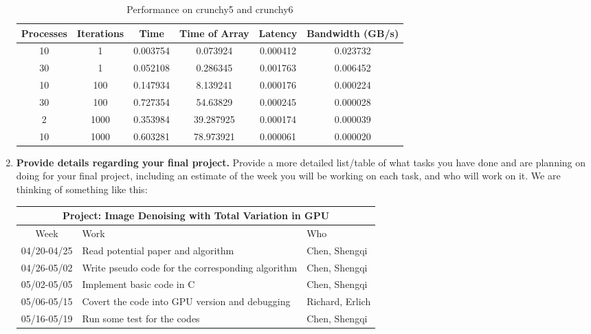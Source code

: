 \documentclass[12pt]{article}
\begin{document}
\begin{enumerate}
	\begin{table}[h!]
\centering
\begin{tabular}{ |c|c|c|c|c|c| }
\hline
Processes&	Iterations&	Time &	Time of Array&	Latency&	Bandwidth (GB/s)\\
\hline
10&	1&	0.003754&	0.073924&	0.000412&	0.023732\\
\hline
30&	1&	0.052108&	0.286345&	0.001763&	0.006452\\
\hline
10&	100&	0.147934&	8.139241&	0.000176&	0.000224\\
\hline
30&	100&	0.727354&	54.63829&	0.000245&	0.000028\\
\hline
2&	1000&	0.353984&	39.287925&	0.000174&	0.000039\\
\hline
10&	1000&	0.603281&	78.973921&	0.000061&	0.000020\\
\hline
\end{tabular}
 \caption{Performance on crunchy5 and crunchy6}
 \label{mpi1}
 \end{table} 


\item {\bf Provide details regarding your final project.}
  Provide a more detailed list/table of what tasks you have done and are planning on
  doing for your final project, including an estimate of the  week
  you will be working on each task, and who will work on it. We are
  thinking of something like this:
  \begin{center}
  \begin{tabular} {|c|p{9cm}|p{2cm}|}
    \hline
    \multicolumn{3}{|c|}{\bf Project: Image Denoising with Total Variation in GPU} \\
    \hline
    Week & Work & Who  \\ \hline \hline
    04/20-04/25 & Read potential paper and algorithm & Chen, Shengqi \\ \hline
    04/26-05/02 & Write pseudo code for the corresponding algorithm  & Chen, Shengqi \\ \hline
    05/02-05/05 &  Implement basic code in C & Chen, Shengqi\\ \hline
    05/06-05/15 & Covert the code into GPU version and debugging & Richard, Erlich \\ \hline
    05/16-05/19 & Run some test for the codes  & Chen, Shengqi \\ \hline
  \end{tabular}
  \end{center}



\end{enumerate}
\end{document}

